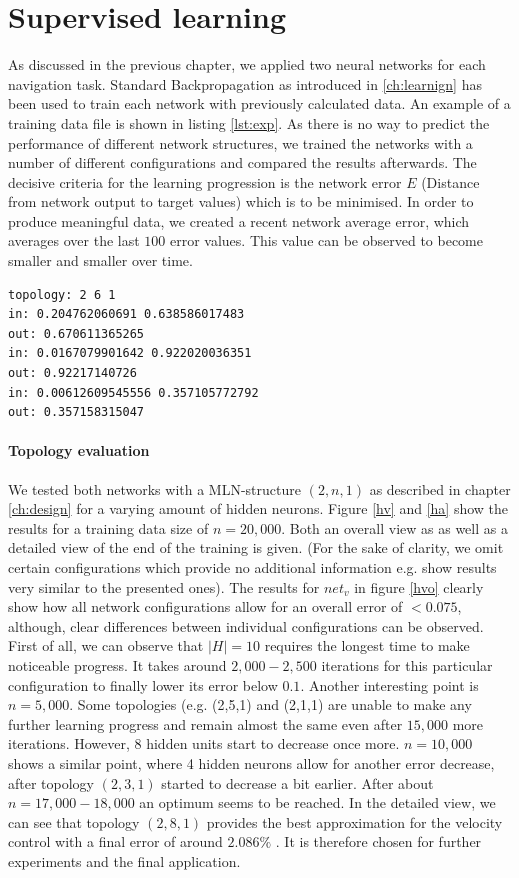 \documentclass[10pt,a4paper,DIV=11]{scrreprt}
\begin{document}
\section{Supervised learning}

As discussed in the previous chapter, we applied two neural networks for each navigation task. Standard Backpropagation as introduced in \ref{ch:learnign} has been used
to train each network with previously calculated data. An example of a training data file is shown in listing \ref{lst:exp}. As there is no way to predict the performance 
of different network structures, we trained the networks with a number of different configurations and compared the results afterwards. The decisive criteria for the
learning progression is the network error $E$ (Distance from network output to target values) which is to be minimised. In order to produce meaningful data, we created
a recent network average error, which averages over the last $100$ error values. This value can be observed to become smaller and smaller over time. 

\begin{lstlisting}[caption={An example of data used to train $net_v$ with Backpropagation.},label={lst:exp},stepnumber=1]
topology: 2 6 1
in: 0.204762060691 0.638586017483
out: 0.670611365265
in: 0.0167079901642 0.922020036351
out: 0.92217140726
in: 0.00612609545556 0.357105772792
out: 0.357158315047
\end{lstlisting}

\paragraph{Topology evaluation} We tested both networks with a MLN-structure $(2,n,1)$ as described in chapter \ref{ch:design} for a varying amount of hidden neurons.
Figure \ref{hv} and \ref{ha} show the results for a training data size of $n = 20,000$. Both an overall view as as well as a detailed view of the end of the training is given.
(For the sake of clarity, we omit certain configurations which provide no additional information e.g. show results very similar to the presented ones).
The results for $net_v$ in figure \ref{hvo} clearly show how all network configurations allow for an overall error of $<0.075$, although, clear differences between individual 
configurations can be observed. First of all, we can observe that $|H| = 10$ requires the longest time to make noticeable progress. It takes around $2,000-2,500$ iterations for this 
particular configuration to finally lower its error below $0.1$. Another interesting point is $n=5,000$. Some topologies (e.g. (2,5,1) and (2,1,1) are unable to make any 
further learning progress and remain almost the same even after $15,000$ more iterations. However, 8 hidden units start to decrease once more. $n=10,000$ shows a similar point, where
4 hidden neurons allow for another error decrease, after topology $(2,3,1)$ started to decrease a bit earlier. After about $n=17,000-18,000$ an optimum seems to be reached. 
In the detailed view, we can see that topology $(2,8,1)$ provides the best approximation for the velocity control with a final error of around $2.086\%$ . 
It is therefore chosen for further experiments and the final application.
\end{document}
